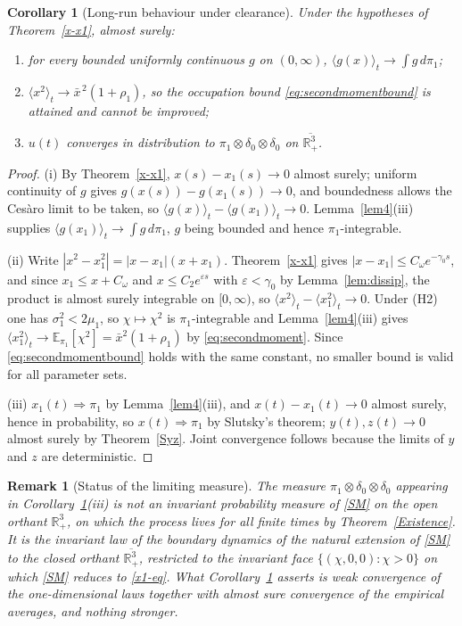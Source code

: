\documentclass{article}
\newtheorem{remark}{Remark}[section]
\newtheorem{corollary}{Corollary}[section]
\newcommand{\avg}[1]{\big\langle #1 \big\rangle_t}
\begin{document}
\begin{corollary}[Long-run behaviour under clearance]\label{cor:attained}
Under the hypotheses of Theorem~\ref{x-x1}, almost surely:
\begin{enumerate}
\item[(i)] for every bounded uniformly continuous $g$ on $(0,\infty)$, $\avg{g(x)}\to\int g\,d\pi_1$;
\item[(ii)] $\avg{x^2}\to\bar x^{\,2}(1+\rho_1)$, so the occupation bound \eqref{eq:secondmomentbound} is attained and cannot be improved;
\item[(iii)] $u(t)$ converges in distribution to $\pi_1\otimes\delta_0\otimes\delta_0$ on $\overline{\mathbb{R}^3_+}$.
\end{enumerate}
\end{corollary}

\begin{proof}
(i) By Theorem~\ref{x-x1}, $x(s)-x_1(s)\to0$ almost surely; uniform continuity of $g$ gives $g(x(s))-g(x_1(s))\to0$, and boundedness allows the Ces\`aro limit to be taken, so $\avg{g(x)}-\avg{g(x_1)}\to0$. Lemma~\ref{lem4}(iii) supplies $\avg{g(x_1)}\to\int g\,d\pi_1$, $g$ being bounded and hence $\pi_1$-integrable.

(ii) Write $|x^2-x_1^2|=|x-x_1|(x+x_1)$. Theorem~\ref{x-x1} gives $|x-x_1|\le C_\omega e^{-\gamma_0s}$, and since $x_1\le x+C_\omega$ and $x\le C_2e^{\varepsilon s}$ with $\varepsilon<\gamma_0$ by Lemma~\ref{lem:dissip}, the product is almost surely integrable on $[0,\infty)$, so $\avg{x^2}-\avg{x_1^2}\to0$. Under (H2) one has $\sigma_1^2<2\mu_1$, so $\chi\mapsto\chi^2$ is $\pi_1$-integrable and Lemma~\ref{lem4}(iii) gives $\avg{x_1^2}\to\mathbb{E}_{\pi_1}[\chi^2]=\bar x^2(1+\rho_1)$ by \eqref{eq:secondmoment}. Since \eqref{eq:secondmomentbound} holds with the same constant, no smaller bound is valid for all parameter sets.

(iii) $x_1(t)\Rightarrow\pi_1$ by Lemma~\ref{lem4}(iii), and $x(t)-x_1(t)\to0$ almost surely, hence in probability, so $x(t)\Rightarrow\pi_1$ by Slutsky's theorem; $y(t),z(t)\to0$ almost surely by Theorem~\ref{Syz}. Joint convergence follows because the limits of $y$ and $z$ are deterministic.
\end{proof}

\begin{remark}[Status of the limiting measure]\label{rem:boundary}
The measure $\pi_1\otimes\delta_0\otimes\delta_0$ appearing in Corollary~\ref{cor:attained}(iii) is \emph{not} an invariant probability measure of \eqref{SM} on the open orthant $\mathbb{R}^3_+$, on which the process lives for all finite times by Theorem~\ref{Existence}. It is the invariant law of the boundary dynamics of the natural extension of \eqref{SM} to the closed orthant $\overline{\mathbb{R}^3_+}$, restricted to the invariant face $\{(\chi,0,0):\chi>0\}$ on which \eqref{SM} reduces to \eqref{x1-eq}. What Corollary~\ref{cor:attained} asserts is weak convergence of the one-dimensional laws together with almost sure convergence of the empirical averages, and nothing stronger.
\end{remark}
\end{document}
